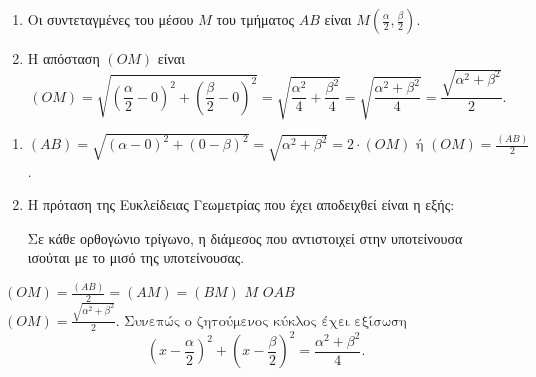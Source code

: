 
\begin{enumerate}
    \item[i.] Οι συντεταγμένες του μέσου $M$ του τμήματος $AB$ είναι $M\left(\frac{\alpha}{2}, \frac{\beta}{2}\right)$.
    \item[ii.] Η απόσταση $(OM)$ είναι
    \[ (OM) = \sqrt{\left(\frac{\alpha}{2}-0\right)^{2}+\left(\frac{\beta}{2}-0\right)^{2}} = \sqrt{\frac{\alpha^{2}}{4}+\frac{\beta^{2}}{4}} = \sqrt{\frac{\alpha^{2}+\beta^{2}}{4}} = \frac{\sqrt{\alpha^{2}+\beta^{2}}}{2} . \]
\end{enumerate}

\begin{enumerate}
    \item[i.] $(AB)=\sqrt{(\alpha-0)^{2}+(0-\beta)^{2}}=\sqrt{\alpha^{2}+\beta^{2}}=2 \cdot(OM) \text{ ή } (OM)=\frac{(AB)}{2}$.
    \item[ii.] Η πρόταση της Ευκλείδειας Γεωμετρίας που έχει αποδειχθεί είναι η εξής:

    Σε κάθε ορθογώνιο τρίγωνο, η διάμεσος που αντιστοιχεί στην υποτείνουσα ισούται με το μισό της υποτείνουσας.
\end{enumerate}

 $(OM)=\frac{(AB)}{2}=(AM)=(BM)$  $M$  $OAB$ 
$(OM) = \frac{\sqrt{\alpha^{2}+\beta^{2}}}{2} . \text{ Συνεπώς ο ζητούμενος κύκλος έχει εξίσωση}$
\[ \left(x-\frac{\alpha}{2}\right)^{2}+\left(x-\frac{\beta}{2}\right)^{2}=\frac{\alpha^{2}+\beta^{2}}{4} . \]
